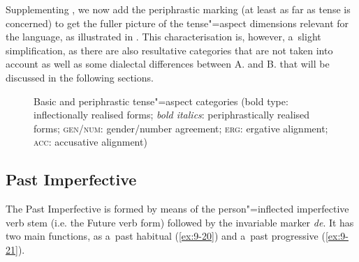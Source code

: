 Supplementing , we now add the periphrastic marking (at least as far as tense is concerned) to get the fuller picture of the tense"=aspect dimensions relevant for the language, as illustrated in . This characterisation is, however, a~slight simplification, as there are also resultative categories that are not taken into account as well as some dialectal differences between A. and B. that will be discussed in the following sections.


\begin{figure}[ht]
\centering
{}
\caption{Basic and periphrastic tense"=aspect categories (bold type: inflectionally realised forms;
  \textit{bold italics}: periphrastically realised forms; \textsc{gen/num}: gender/number agreement;
  \textsc{erg}: ergative alignment; \textsc{acc}: accusative alignment)\label{fig:9-2}}
\end{figure}

\subsection{Past Imperfective}
\label{subsec:9-1-6}

The Past Imperfective is formed by means of the person"=inflected imperfective verb stem (i.e. the Future verb form) followed by the invariable marker \textit{de}. It has two main functions, as a~past habitual (\ref{ex:9-20}) and a~past progressive (\ref{ex:9-21}).

